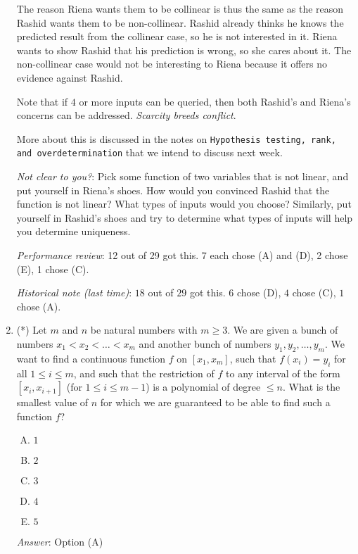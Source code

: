 \documentclass[10pt]{amsart}
\begin{document}
\begin{enumerate}
  The reason Riena wants them to be collinear is thus the same as the
  reason Rashid wants them to be non-collinear. Rashid already thinks
  he knows the predicted result from the collinear case, so he is not
  interested in it. Riena wants to show Rashid that his prediction is
  wrong, so she cares about it. The non-collinear case would not be
  interesting to Riena because it offers no evidence against Rashid.

  Note that if $4$ or more inputs can be queried, then both Rashid's
  and Riena's concerns can be addressed. {\em Scarcity breeds
    conflict}.

  More about this is discussed in the notes on {\tt Hypothesis
    testing, rank, and overdetermination} that we intend to discuss
  next week.

  {\em Not clear to you?}: Pick some function of two variables that is
  not linear, and put yourself in Riena's shoes. How would you
  convinced Rashid that the function is not linear? What types of
  inputs would you choose? Similarly, put yourself in Rashid's shoes
  and try to determine what types of inputs will help you determine
  uniqueness.

  {\em Performance review}: 12 out of 29 got this. 7 each chose (A)
  and (D), 2 chose (E), 1 chose (C).

  {\em Historical note (last time)}: $18$ out of $29$ got this. $6$ chose (D),
  $4$ chose (C), $1$ chose (A).

\item (*) Let $m$ and $n$ be natural numbers with $m \ge 3$. We are
  given a bunch of numbers $x_1< x_2< \dots<x_m$ and another bunch of
  numbers $y_1,y_2,\dots,y_m$. We want to find a continuous function
  $f$ on $[x_1,x_m]$, such that $f(x_i) = y_i$ for all $1 \le i \le
  m$, and such that the restriction of $f$ to any interval of the form
  $[x_i,x_{i+1}]$ (for $1 \le i \le m - 1$) is a polynomial of degree
  $\le n$. What is the smallest value of $n$ for which we are
  guaranteed to be able to find such a function $f$?

  \begin{enumerate}[(A)]
  \item $1$
  \item $2$
  \item $3$
  \item $4$
  \item $5$
  \end{enumerate}

  {\em Answer}: Option (A)


\end{enumerate}
\end{document}
